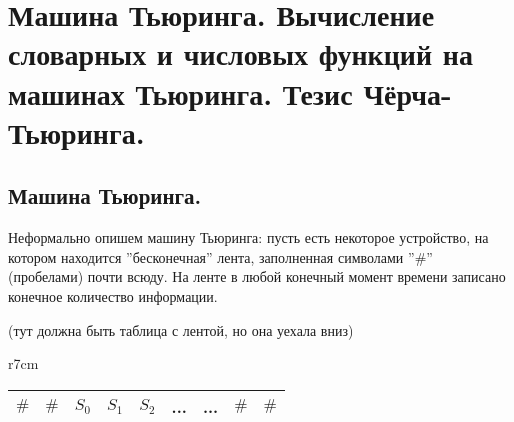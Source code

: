 \section{Машина Тьюринга. Вычисление словарных и числовых функций на машинах Тьюринга. Тезис Чёрча- Тьюринга.}
\subsection*{Машина Тьюринга.}
\par Неформально опишем машину Тьюринга: пусть есть некоторое устройство, на котором находится ''бесконечная'' лента, заполненная символами ''$\#$'' (пробелами) почти всюду.
На ленте в любой конечный момент времени записано конечное количество информации.

(тут должна быть таблица с лентой, но она уехала вниз)

\begin{wraptable}{r}{7cm}
    \begin{tabular}{ c|c|c|c|c|c|c|c|c } 
    \hline
     $\#$ & $\#$ & $S_{0}$ & $S_{1}$ & $S_{2}$ & ... & ... & $\#$ & $\#$ \\  \hline
    \end{tabular}
    \\
\end{wraptable}


